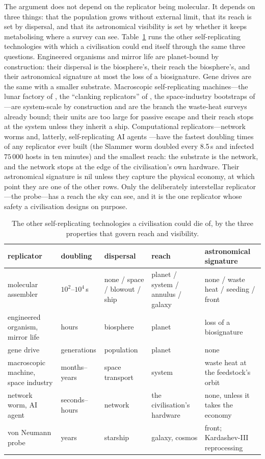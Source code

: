 \documentclass[11pt]{article}
\begin{document}
The argument does not depend on the replicator being molecular.  It depends
on three things: that the population grows without external limit, that its
reach is set by dispersal, and that its astronomical visibility is set by
whether it keeps metabolising where a survey can see.  Table~\ref{tab:general}
runs the other self-replicating technologies with which a civilisation could
end itself through the same three questions.  Engineered organisms
\citep{Millett2017,Esvelt2022} and mirror life \citep{Adamala2024} are
planet-bound by construction: their dispersal is the biosphere's, their reach
the biosphere's, and their astronomical signature at most the loss of a
biosignature.  Gene drives \citep{Noble2018} are the same with a smaller
substrate.  Macroscopic self-replicating machines---the lunar factory of
\citet{Freitas1980b}, the ``clanking replicators'' of \citet{Moses2020}, the
space-industry bootstraps of \citet{Metzger2013}---are system-scale by
construction and are the branch the waste-heat surveys already bound; their
units are too large for passive escape and their reach stops at the system
unless they inherit a ship.  Computational replicators---network worms
\citep{Moore2003,Staniford2002} and, latterly, self-replicating AI agents
\citep{Pan2024}---have the fastest doubling times of any replicator ever
built (the Slammer worm doubled every 8.5\,s and infected $75\,000$ hosts in
ten minutes) and the smallest reach: the substrate is the network, and the
network stops at the edge of the civilisation's own hardware.  Their
astronomical signature is nil unless they capture the physical economy, at
which point they are one of the other rows.  Only the deliberately
interstellar replicator---the probe---has a reach the sky can see, and it is
the one replicator whose safety a civilisation designs on purpose.

\begin{table}
\centering
\small
\caption{The other self-replicating technologies a civilisation could die of,
by the three properties that govern reach and visibility.}
\label{tab:general}
\begin{tabular}{p{3.0cm}p{2.0cm}p{2.6cm}p{2.6cm}p{3.6cm}}
\toprule
replicator & doubling & dispersal & reach & astronomical signature \\
\midrule
molecular assembler & $10^{2}$--$10^{4}$\,s & none / space / blowout / ship & planet / system / annulus / galaxy & none / waste heat / seeding / front \\
engineered organism, mirror life & hours & biosphere & planet & loss of a biosignature \\
gene drive & generations & population & planet & none \\
macroscopic machine, space industry & months--years & space transport & system & waste heat at the feedstock's orbit \\
network worm, AI agent & seconds--hours & network & the civilisation's hardware & none, unless it takes the economy \\
von Neumann probe & years & starship & galaxy, cosmos & front; Kardashev-III reprocessing \\
\bottomrule
\end{tabular}
\end{table}
\end{document}
